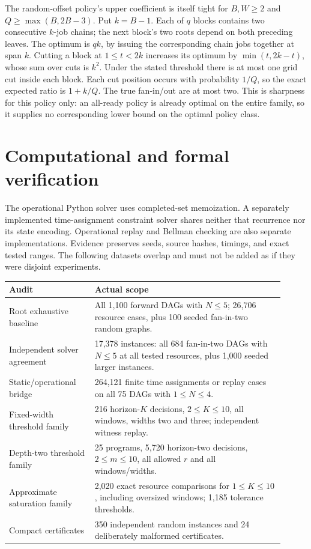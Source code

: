 \documentclass[11pt]{article}
\begin{document}
The random-offset policy's upper coefficient is itself tight for
$B,W\ge2$ and $Q\ge\max(B,2B-3)$. Put $k=B-1$. Each of $q$ blocks
contains two consecutive $k$-job chains; the next block's two roots
depend on both preceding leaves. The optimum is $qk$, by issuing the
corresponding chain jobs together at span $k$. Cutting a block at
$1\le t<2k$ increases its optimum by $\min(t,2k-t)$, whose sum over
cuts is $k^2$. Under the stated threshold there is at most one grid
cut inside each block. Each cut position occurs with probability $1/Q$,
so the exact expected ratio is $1+k/Q$. The true fan-in/out are at most
two. This is sharpness for this policy only: an all-ready policy is
already optimal on the entire family, so it supplies no corresponding
lower bound on the optimal policy class.

\section{Computational and formal verification}
The operational Python solver uses completed-set memoization. A separately
implemented time-assignment constraint solver shares neither that recurrence
nor its state encoding. Operational replay and Bellman checking are also
separate implementations. Evidence preserves seeds, source hashes, timings,
and exact tested ranges. The following datasets overlap and must not be
added as if they were disjoint experiments.

\begin{center}\small
\begin{tabular}{p{0.29\linewidth}p{0.62\linewidth}}
\toprule
Audit & Actual scope\\\midrule
Root exhaustive baseline & All 1,100 forward DAGs with $N\le5$;
26,706 resource cases, plus 100 seeded fan-in-two random graphs.\\
Independent solver agreement & 17,378 instances: all 684 fan-in-two
DAGs with $N\le5$ at all tested resources, plus 1,000 seeded larger instances.\\
Static/operational bridge & 264,121 finite time assignments or replay cases
on all 75 DAGs with $1\le N\le4$.\\
Fixed-width threshold family & 216 horizon-$K$ decisions, $2\le K\le10$,
all windows, widths two and three; independent witness replay.\\
Depth-two threshold family & 25 programs, 5,720 horizon-two decisions,
$2\le m\le10$, all allowed $r$ and all windows/widths.\\
Approximate saturation family & 2,020 exact resource comparisons for
$1\le K\le10$, including oversized windows; 1,185 tolerance thresholds.\\
Compact certificates & 350 independent random instances and
24 deliberately malformed certificates.\\\bottomrule
\end{tabular}
\end{center}
\end{document}

